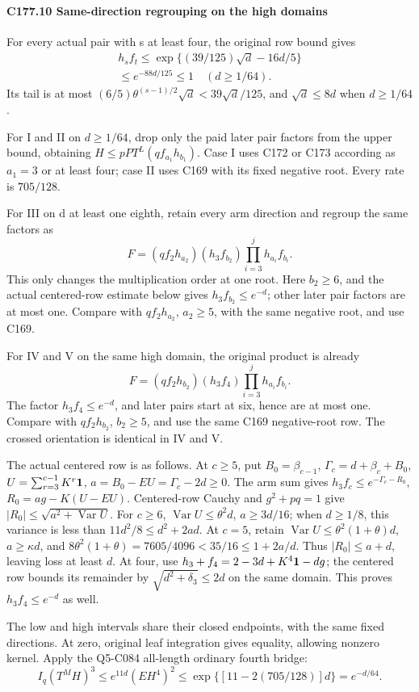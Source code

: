 \paragraph{C177.10 Same-direction regrouping on the high domains}

For every actual pair with s at least four, the original row bound gives
\[
\begin{gathered}
h_sf_t\le\exp\{(39/125)\sqrt d-16d/5\}\\
\le e^{-88d/125}\le1\quad(d\ge1/64).
\end{gathered}\tag{C177.T184.27}
\]
Its tail is at most \((6/5)\theta^{(s-1)/2}\sqrt d<39\sqrt d/125\), and \(\sqrt d\le8d\) when \(d\ge1/64\).

For I and II on \(d\ge1/64\), drop only the paid later pair factors from the upper bound, obtaining \(H\le pPT^L(qf_{a_1}h_{b_1})\). Case I uses C172 or C173 according as \(a_1=3\) or at least four; case II uses C169 with its fixed negative root. Every rate is \(705/128\).

For III on d at least one eighth, retain every arm direction and regroup the same factors as
\[
F=(qf_2h_{a_2})(h_3f_{b_2})\prod_{i=3}^jh_{a_i}f_{b_i}. \tag{C177.T184.28}
\]
This only changes the multiplication order at one root. Here \(b_2\ge6\), and the actual centered-row estimate below gives \(h_3f_{b_2}\le e^{-d}\); other later pair factors are at most one. Compare with \(qf_2h_{a_2}\), \(a_2\ge5\), with the same negative root, and use C169.

For IV and V on the same high domain, the original product is already
\[
F=(qf_2h_{b_2})(h_3f_4)\prod_{i=3}^jh_{a_i}f_{b_i}.     \tag{C177.T184.29}
\]
The factor \(h_3f_4\le e^{-d}\), and later pairs start at six, hence are at most one. Compare with \(qf_2h_{b_2}\), \(b_2\ge5\), and use the same C169 negative-root row. The crossed orientation is identical in IV and V.

The actual centered row is as follows. At \(c\ge5\), put \(B_0=\beta_{c-1}\), \(\Gamma_c=d+\beta_c+B_0\), \(U=\sum_{r=3}^{c-1}K^r\mathbf1\), \(a=B_0-EU=\Gamma_c-2d\ge0\). The arm sum gives \(h_3f_c\le e^{-\Gamma_c-R_0}\), \(R_0=ag-K(U-EU)\). Centered-row Cauchy and \(g^2+pq=1\) give \(|R_0|\le\sqrt{a^2+\operatorname{\operatorname{Var}}U}\). For \(c\ge6\), \(\operatorname{\operatorname{Var}}U\le\theta^2d\), \(a\ge3d/16\); when \(d\ge1/8\), this variance is less than \(11d^2/8\le d^2+2ad\). At \(c=5\), retain \(\operatorname{\operatorname{Var}}U\le\theta^2(1+\theta)d\), \(a\ge\kappa d\), and \(8\theta^2(1+\theta)=7605/4096<35/16\le1+2a/d\). Thus \(|R_0|\le a+d\), leaving loss at least \(d\). At four, use \(h_3+f_4=2-3d+K^4\mathbf1-dg\); the centered row bounds its remainder by \(\sqrt{d^2+\delta_3}\le2d\) on the same domain. This proves \(h_3f_4\le e^{-d}\) as well.

The low and high intervals share their closed endpoints, with the same fixed directions. At zero, original leaf integration gives equality, allowing nonzero kernel. Apply the Q5-C084 all-length ordinary fourth bridge:
\[
I_q(T^MH)^3\le e^{11d}(EH^4)^2
\le\exp\{[11-2(705/128)]d\}=e^{-d/64}.
\]
